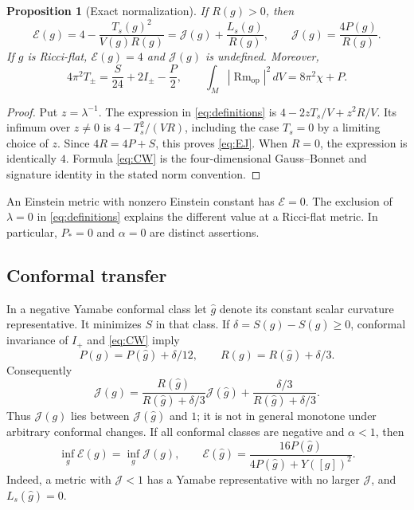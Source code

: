 \documentclass[11pt,a4paper]{article}
\newtheorem{proposition}[theorem]{Proposition}
\theoremstyle{definition}\newtheorem{definition}[theorem]{Definition}
\theoremstyle{remark}\newtheorem{remark}[theorem]{Remark}
\newcommand{\Rm}{\operatorname{Rm}}
\newcommand{\E}{\mathcal E}
\newcommand{\J}{\mathcal J}
\newcommand{\dd}{\,dV}
\begin{document}
\begin{proposition}[Exact normalization]\label{prop:normalization}
If $R(g)>0$, then
\begin{equation}\label{eq:EJ}
 \E(g)=4-\frac{T_s(g)^2}{V(g)R(g)}
 =\J(g)+\frac{L_s(g)}{R(g)},\qquad \J(g)=\frac{4P(g)}{R(g)}.
\end{equation}
If $g$ is Ricci-flat, $\E(g)=4$ and $\J(g)$ is undefined. Moreover,
\begin{equation}\label{eq:CW}
 4\pi^2T_\pm=\frac{S}{24}+2I_\pm-\frac P2,
 \qquad \int_M|\Rm_{\mathrm{op}}|^2\dd=8\pi^2\chi+P.
\end{equation}
\end{proposition}
\begin{proof}
Put $z=\lambda^{-1}$. The expression in \eqref{eq:definitions} is
$4-2zT_s/V+z^2R/V$. Its infimum over $z\ne0$ is $4-T_s^2/(VR)$, including the case $T_s=0$ by a limiting choice of $z$. Since $4R=4P+S$, this proves \eqref{eq:EJ}. When $R=0$, the expression is identically $4$. Formula \eqref{eq:CW} is the four-dimensional Gauss--Bonnet and signature identity in the stated norm convention.
\end{proof}

An Einstein metric with nonzero Einstein constant has $\E=0$. The exclusion of $\lambda=0$ in \eqref{eq:definitions} explains the different value at a Ricci-flat metric. In particular, $P_*=0$ and $\alpha=0$ are distinct assertions.

\subsection{Conformal transfer}
In a negative Yamabe conformal class let $\widehat g$ denote its constant scalar curvature representative. It minimizes $S$ in that class. If
$\delta=S(g)-S(\widehat g)\ge0$, conformal invariance of $I_+$ and \eqref{eq:CW} imply
\begin{equation}\label{eq:conformal}
 P(g)=P(\widehat g)+\delta/12,\qquad
 R(g)=R(\widehat g)+\delta/3.
\end{equation}
Consequently
\begin{equation}\label{eq:convexJ}
 \J(g)=\frac{R(\widehat g)}{R(\widehat g)+\delta/3}\J(\widehat g)
 +\frac{\delta/3}{R(\widehat g)+\delta/3}.
\end{equation}
Thus $\J(g)$ lies between $\J(\widehat g)$ and $1$; it is not in general monotone under arbitrary conformal changes. If all conformal classes are negative and $\alpha<1$, then
\begin{equation}\label{eq:infEJ}
 \inf_g\E(g)=\inf_g\J(g),\qquad
 \E(\widehat g)=\frac{16P(\widehat g)}{4P(\widehat g)+Y([g])^2}.
\end{equation}
Indeed, a metric with $\J<1$ has a Yamabe representative with no larger $\J$, and $L_s(\widehat g)=0$.
\end{document}
